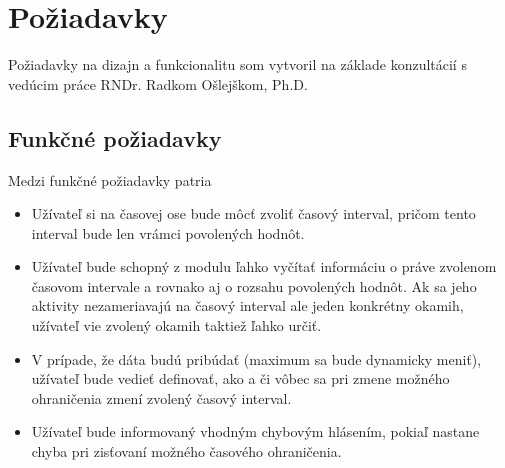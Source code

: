 \documentclass[
  digital, %
  twoside, %
  notable,   %
  nolof,   %
  nolot,   %
]{fithesis3}
\begin{document}
\section{Požiadavky}
\label{requirements}
Požiadavky na dizajn a funkcionalitu som vytvoril na základe konzultácií s vedúcim práce RNDr. Radkom Ošlejškom, Ph.D.

\subsection{Funkčné požiadavky}
\label{funkcne_poziadavky}
Medzi funkčné požiadavky patria
\begin{itemize}
\item Užívateľ si na časovej ose bude môcť zvoliť časový interval, pričom tento interval bude len vrámci povolených hodnôt.
\item Užívateľ bude schopný z modulu ľahko vyčítať informáciu o práve zvolenom časovom intervale a rovnako aj o rozsahu povolených hodnôt. Ak sa jeho aktivity nezameriavajú na časový interval ale jeden konkrétny okamih, užívateľ vie zvolený okamih taktiež ľahko určiť.
\item V prípade, že dáta budú pribúdať (maximum sa bude dynamicky meniť), užívateľ bude vedieť definovať, ako a či vôbec sa pri zmene možného ohraničenia zmení zvolený časový interval.
\item Užívateľ bude informovaný vhodným chybovým hlásením, pokiaľ nastane chyba pri zisťovaní možného časového ohraničenia.
\end{itemize}
\end{document}
